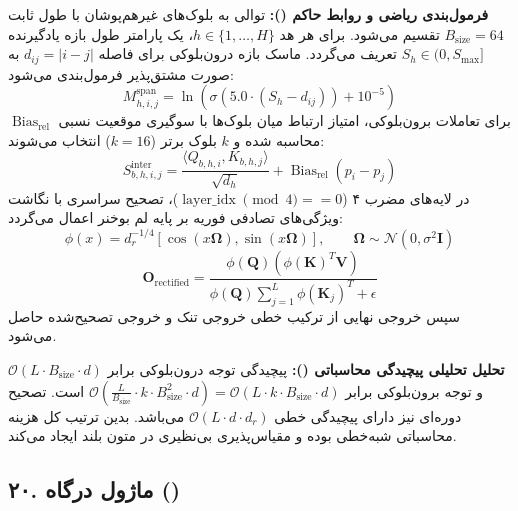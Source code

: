 \textbf{فرمول‌بندی ریاضی و روابط حاکم ():}
توالی به بلوک‌های غیرهم‌پوشان با طول ثابت $B_{\text{size}} = 64$ تقسیم می‌شود.
برای هر هد $h \in \{1, \dots, H\}$، یک پارامتر طول بازه یادگیرنده $S_h \in (0, S_{\max}]$ تعریف می‌گردد. ماسک بازه درون‌بلوکی برای فاصله $d_{ij} = |i - j|$ به صورت مشتق‌پذیر فرمول‌بندی می‌شود:
\begin{equation}
M^{\text{span}}_{h, i, j} = \ln\left( \sigma\left( 5.0 \cdot (S_h - d_{ij}) \right) + 10^{-5} \right)
\end{equation}
برای تعاملات برون‌بلوکی، امتیاز ارتباط میان بلوک‌ها با سوگیری موقعیت نسبی $\operatorname{Bias}_{\text{rel}}$ محاسبه شده و $k$ بلوک برتر ($k=16$) انتخاب می‌شوند:
\begin{equation}
S^{\text{inter}}_{b, h, i, j} = \frac{\langle Q_{b, h, i}, K_{b, h, j} \rangle}{\sqrt{d_h}} + \operatorname{Bias}_{\text{rel}}(p_i - p_j)
\end{equation}
در لایه‌های مضرب ۴ ($\operatorname{layer\_idx} \pmod 4 == 0$)، تصحیح سراسری با نگاشت ویژگی‌های تصادفی فوریه بر پایه لم بوخنر اعمال می‌گردد:
\begin{equation}
\phi(x) = d_r^{-1/4} [\cos(x \mathbf{\Omega}), \sin(x \mathbf{\Omega})], \qquad \mathbf{\Omega} \sim \mathcal{N}(0, \sigma^2 \mathbf{I})
\end{equation}
\begin{equation}
\mathbf{O}_{\text{rectified}} = \frac{\phi(\mathbf{Q}) \left( \phi(\mathbf{K})^T \mathbf{V} \right)}{\phi(\mathbf{Q}) \sum_{j=1}^L \phi(\mathbf{K}_j)^T + \epsilon}
\end{equation}
سپس خروجی نهایی از ترکیب خطی خروجی تنک و خروجی تصحیح‌شده حاصل می‌شود.

\textbf{تحلیل تحلیلی پیچیدگی محاسباتی ():}
پیچیدگی توجه درون‌بلوکی برابر $\mathcal{O}(L \cdot B_{\text{size}} \cdot d)$ و توجه برون‌بلوکی برابر $\mathcal{O}(\frac{L}{B_{\text{size}}} \cdot k \cdot B_{\text{size}}^2 \cdot d) = \mathcal{O}(L \cdot k \cdot B_{\text{size}} \cdot d)$ است. تصحیح دوره‌ای  نیز دارای پیچیدگی خطی $\mathcal{O}(L \cdot d \cdot d_r)$ می‌باشد. بدین ترتیب کل هزینه محاسباتی شبه‌خطی بوده و مقیاس‌پذیری بی‌نظیری در متون بلند ایجاد می‌کند.



\subsection*{۲۰. ماژول درگاه  ()}

